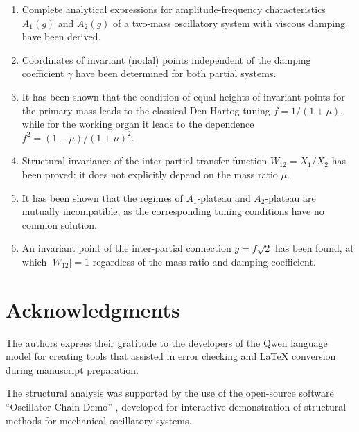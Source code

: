 \documentclass[12pt, a4paper]{article}
\begin{document}
\begin{enumerate}
	\item Complete analytical expressions for amplitude-frequency characteristics $A_1(g)$ and $A_2(g)$ of a two-mass oscillatory system with viscous damping have been derived.
	
	\item Coordinates of invariant (nodal) points independent of the damping coefficient $\gamma$ have been determined for both partial systems.
	
	\item It has been shown that the condition of equal heights of invariant points for the primary mass leads to the classical Den Hartog tuning $f = 1/(1+\mu)$, while for the working organ it leads to the dependence $f^2 = (1-\mu)/(1+\mu)^2$.
	
	\item Structural invariance of the inter-partial transfer function $W_{12} = X_1/X_2$ has been proved: it does not explicitly depend on the mass ratio $\mu$.
	
	\item It has been shown that the regimes of $A_1$-plateau and $A_2$-plateau are mutually incompatible, as the corresponding tuning conditions have no common solution.
	
	\item An invariant point of the inter-partial connection $g = f\sqrt{2}$ has been found, at which $|W_{12}| = 1$ regardless of the mass ratio and damping coefficient.
\end{enumerate}
	

\section*{Acknowledgments}

The authors express their gratitude to the developers of the Qwen language model for creating tools that assisted in error checking and LaTeX conversion during manuscript preparation.

The structural analysis was supported by the use of the open-source software ``Oscillator Chain Demo'' \cite{EliseevSoftware2026}, developed for interactive demonstration of structural methods for mechanical oscillatory systems.
	
\end{document}
